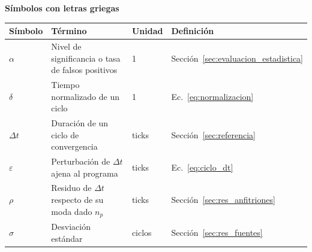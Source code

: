 {\bfseries\fontsize{14}{16}\selectfont Símbolos con letras griegas\par}
\nopagebreak\vspace{0.5ex}
{\small\interlineadoSencillo\setlength{\LTleft}{0pt}\setlength{\LTright}{0pt plus 1fill}
\begin{longtable}{@{}p{1.7cm}p{7.3cm}p{1.9cm}p{3.1cm}@{}}
\textbf{Símbolo} & \textbf{Término} & \textbf{Unidad} & \textbf{Definición}\\[0.6ex]
\endhead
$\alpha$ & Nivel de significancia o tasa de falsos positivos & 1 & Sección~\ref{sec:evaluacion_estadistica}\\[0.6ex]
$\delta$ & Tiempo normalizado de un ciclo & 1 & Ec.~\eqref{eq:normalizacion}\\[0.6ex]
$\Delta t$ & Duración de un ciclo de convergencia & ticks & Sección~\ref{sec:referencia}\\[0.6ex]
$\varepsilon$ & Perturbación de $\Delta t$ ajena al programa & ticks & Ec.~\eqref{eq:ciclo_dt}\\[0.6ex]
$\rho$ & Residuo de $\Delta t$ respecto de su moda dado $n_p$ & ticks & Sección~\ref{sec:res_anfitriones}\\[0.6ex]
$\sigma$ & Desviación estándar & ciclos & Sección~\ref{sec:res_fuentes}\\
\end{longtable}}

